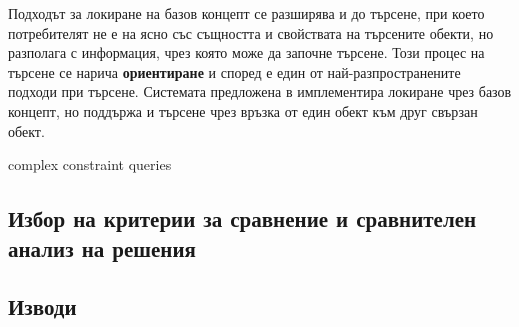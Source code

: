 \documentclass[a4paper,12pt]{article}
\begin{document}
\bigbreak

Подходът за локиране на базов концепт се разширява и до търсене, при което потребителят не е на ясно със същността и свойствата на търсените обекти, но разполага с информация, чрез която може да започне търсене. Този процес на търсене се нарича \textbf{ориентиране} и според \cite{orienteering} е един от най-разпространените подходи при търсене. Системата предложена в \cite{haystack} имплементира локиране чрез базов концепт, но поддържа и търсене чрез връзка от един обект към друг свързан обект.

\bigbreak

complex constraint queries


\subsection{Избор на критерии за сравнение и сравнителен анализ на решения}

\subsection{Изводи}

\printbibliography[title={Използвана литература}]
\end{document}
